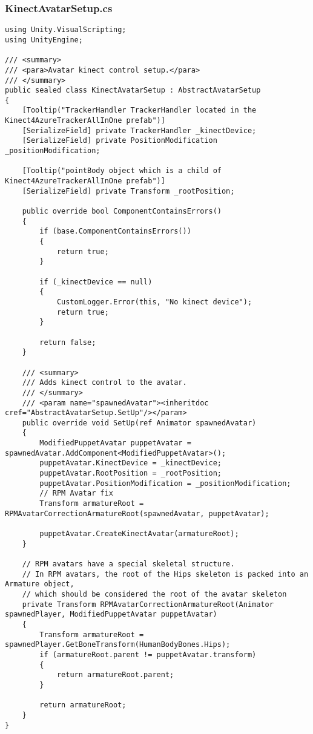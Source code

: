 \subsubsection*{KinectAvatarSetup.cs}
\begin{verbatim}
using Unity.VisualScripting;
using UnityEngine;

/// <summary>
/// <para>Avatar kinect control setup.</para>
/// </summary>
public sealed class KinectAvatarSetup : AbstractAvatarSetup
{
    [Tooltip("TrackerHandler TrackerHandler located in the Kinect4AzureTrackerAllInOne prefab")]
    [SerializeField] private TrackerHandler _kinectDevice;
    [SerializeField] private PositionModification _positionModification;

    [Tooltip("pointBody object which is a child of Kinect4AzureTrackerAllInOne prefab")]
    [SerializeField] private Transform _rootPosition;
    
    public override bool ComponentContainsErrors()
    {
        if (base.ComponentContainsErrors())
        {
            return true;
        }

        if (_kinectDevice == null)
        {
            CustomLogger.Error(this, "No kinect device");
            return true;
        }

        return false;
    }

    /// <summary>
    /// Adds kinect control to the avatar.
    /// </summary>
    /// <param name="spawnedAvatar"><inheritdoc cref="AbstractAvatarSetup.SetUp"/></param>
    public override void SetUp(ref Animator spawnedAvatar)
    {
        ModifiedPuppetAvatar puppetAvatar = spawnedAvatar.AddComponent<ModifiedPuppetAvatar>();
        puppetAvatar.KinectDevice = _kinectDevice;
        puppetAvatar.RootPosition = _rootPosition;
        puppetAvatar.PositionModification = _positionModification;
        // RPM Avatar fix
        Transform armatureRoot = RPMAvatarCorrectionArmatureRoot(spawnedAvatar, puppetAvatar);

        puppetAvatar.CreateKinectAvatar(armatureRoot);
    }

    // RPM avatars have a special skeletal structure.
    // In RPM avatars, the root of the Hips skeleton is packed into an Armature object,
    // which should be considered the root of the avatar skeleton
    private Transform RPMAvatarCorrectionArmatureRoot(Animator spawnedPlayer, ModifiedPuppetAvatar puppetAvatar)
    {
        Transform armatureRoot = spawnedPlayer.GetBoneTransform(HumanBodyBones.Hips);
        if (armatureRoot.parent != puppetAvatar.transform)
        {
            return armatureRoot.parent;
        }

        return armatureRoot;
    }
}
\end{verbatim}
